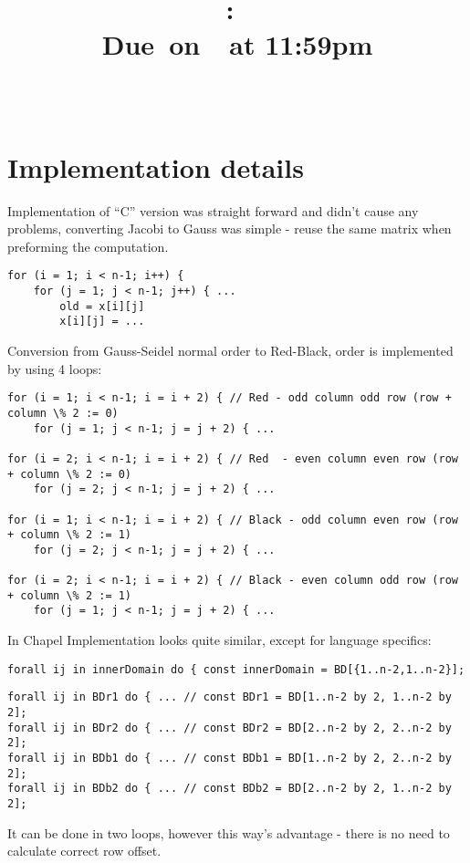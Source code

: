 \documentclass{article}
\title{
    \vspace{2in}
    \textmd{\textbf{\hmwkClass:\ \hmwkTitle}}\\
        \normalsize\vspace{0.1in}\small{Due\ on\ \hmwkDueDate\ at 11:59pm}\\
        \vspace{0.1in}\large{\textit{\hmwkClassInstructor\ \hmwkClassTime}}
    \vspace{3in}
}
\author{\textbf{\hmwkAuthorName}}
\date{  }
\begin{document}
\maketitle

\pagebreak

\section{Implementation details}

Implementation of ``C'' version was straight forward and didn't cause any problems,
converting Jacobi to Gauss was simple - reuse the same matrix when preforming the
computation.
\begin{lstlisting}
for (i = 1; i < n-1; i++) {
    for (j = 1; j < n-1; j++) { ...
        old = x[i][j]
        x[i][j] = ...
\end{lstlisting}

Conversion from Gauss-Seidel normal order to Red-Black, order is implemented by using 4
loops:
\begin{lstlisting}
for (i = 1; i < n-1; i = i + 2) { // Red - odd column odd row (row + column \% 2 := 0)
    for (j = 1; j < n-1; j = j + 2) { ...

for (i = 2; i < n-1; i = i + 2) { // Red  - even column even row (row + column \% 2 := 0)
    for (j = 2; j < n-1; j = j + 2) { ...

for (i = 1; i < n-1; i = i + 2) { // Black - odd column even row (row + column \% 2 := 1)
    for (j = 2; j < n-1; j = j + 2) { ...

for (i = 2; i < n-1; i = i + 2) { // Black - even column odd row (row + column \% 2 := 1)
    for (j = 1; j < n-1; j = j + 2) { ...
\end{lstlisting}

In Chapel Implementation looks quite similar, except for language specifics:
\begin{lstlisting}
forall ij in innerDomain do { const innerDomain = BD[{1..n-2,1..n-2}];

\end{lstlisting}
\begin{lstlisting}
forall ij in BDr1 do { ... // const BDr1 = BD[1..n-2 by 2, 1..n-2 by 2];
forall ij in BDr2 do { ... // const BDr2 = BD[2..n-2 by 2, 2..n-2 by 2];
forall ij in BDb1 do { ... // const BDb1 = BD[1..n-2 by 2, 2..n-2 by 2];
forall ij in BDb2 do { ... // const BDb2 = BD[2..n-2 by 2, 1..n-2 by 2];
\end{lstlisting}

It can be done in two loops, however this way's advantage - there is no need to calculate
correct row offset. \\
\end{document}
